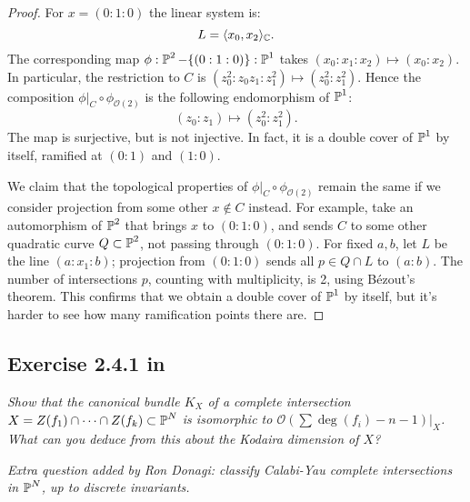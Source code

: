 \documentclass{article}
\begin{document}
\begin{proof}
For $x = (0:1:0)$ the linear system is:
\[	L = \langle x_0, x_2 \rangle_{\mathbb{C}}.	\]
The corresponding map $\phi : \operatorname{\mathbb{P}}^2 - \{(0:1:0)\} : \operatorname{\mathbb{P}}^1$ takes $(x_0 : x_1 : x_2) \mapsto (x_0:x_2)$. In particular,
the restriction to $C$ is $(z_0^2 : z_0z_1 : z_1^2) \mapsto (z_0^2:z_1^2)$. Hence the composition
$\phi|_{C} \circ \phi_{\mathcal{O}(2)}$ is the following endomorphism of $\operatorname{\mathbb{P}}^1$:
\[	(z_0:z_1) \mapsto (z_0^2 : z_1^2).	\]
The map is surjective, but is not injective. In fact, it is a double cover of $\operatorname{\mathbb{P}}^1$ by itself, ramified at
$(0:1)$ and $(1:0)$.

We claim that the topological properties of $\phi|_{C} \circ \phi_{\mathcal{O}(2)}$ remain the same if we consider
projection from some other $x \not \in C$ instead. For example, take an automorphism of $\operatorname{\mathbb{P}}^2$ that brings
$x$ to $(0:1:0)$, and sends $C$ to some other quadratic curve $Q \subset \operatorname{\mathbb{P}}^2$, not passing through $(0:1:0)$. 
For fixed $a,b$, let $L$ be the line $(a:x_1:b)$; projection from $(0:1:0)$ sends all $p \in Q \cap L$ to
$(a:b)$. The number of intersections $p$, counting with multiplicity, is 2, using B\'ezout's theorem. This
confirms that we obtain a double cover of $\operatorname{\mathbb{P}}^1$ by itself, but it's harder to see how many ramification points
there are.
\end{proof}


\subsection*{Exercise 2.4.1 in \cite{Huy}}
\emph{Show that the canonical bundle $K_X$ of a complete intersection $X = Z(f_1) \cap \dots \cap Z(f_k)
\subset \operatorname{\mathbb{P}}^N$ is isomorphic to $\mathcal{O}(\sum \deg(f_i) - n - 1)|_X$. What can you deduce from this
about the Kodaira dimension of $X$?}

\emph{Extra question added by Ron Donagi: classify Calabi-Yau complete intersections in $\operatorname{\mathbb{P}}^N$, up to 
discrete invariants.}
\end{document}
